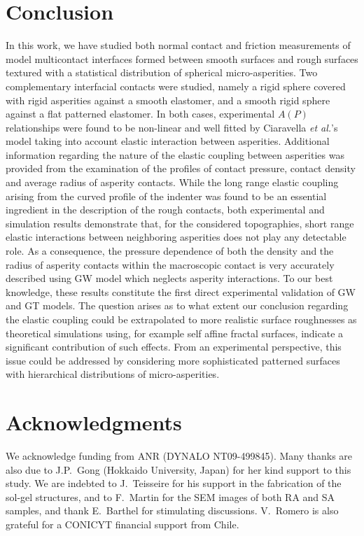 \documentclass[pre,groupedaddress,showkeys,showpacs,twocolumn]{revtex4}
\begin{document}
\section*{Conclusion}
%
In this work, we have studied both normal contact and friction measurements of model multicontact interfaces formed between smooth surfaces and rough surfaces textured with a statistical distribution of spherical micro-asperities. Two complementary interfacial contacts were studied, namely a rigid sphere covered with rigid asperities against a smooth elastomer, and a smooth rigid sphere against a flat patterned elastomer. In both cases, experimental $A(P)$ relationships were found to be non-linear and well fitted by Ciaravella \textit{et al.}'s model taking into account elastic interaction between asperities. Additional information regarding the nature of the elastic coupling between asperities was provided from the examination of the profiles of contact pressure, contact density and average radius of asperity contacts. While the long range elastic coupling arising from the curved profile of the indenter was found to be an essential ingredient in the description of the rough contacts, both experimental and 
simulation results demonstrate that, for the considered topographies, short range elastic interactions between neighboring asperities does not play any detectable role. As a consequence, the pressure dependence of both the density and the radius of asperity contacts within the macroscopic contact is very accurately described using GW model which neglects asperity interactions. To our best knowledge, these results constitute the first direct experimental validation of GW and GT models. The question arises as to what extent our conclusion regarding the elastic coupling could be extrapolated to more realistic surface roughnesses as theoretical simulations using, for example self affine fractal surfaces, indicate a significant contribution of such effects. From an experimental perspective, this issue could be addressed by considering more sophisticated patterned surfaces with hierarchical distributions of micro-asperities.
%
\section*{Acknowledgments}
%
We acknowledge funding from ANR (DYNALO NT09-499845). Many thanks are also due to J.P.~Gong (Hokkaido University, Japan) for her kind support to this study. We are indebted to J.~Teisseire for his support in the fabrication of the sol-gel structures, and to F.~Martin for the SEM images of both RA and SA samples, and thank E.~Barthel for stimulating discussions. V.~Romero is also grateful for a CONICYT financial support from Chile.
%
\appendix
%
\end{document}
